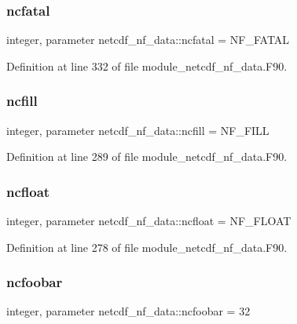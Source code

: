\subsubsection{\texorpdfstring{ncfatal}{ncfatal}}
{\footnotesize\ttfamily integer, parameter netcdf\+\_\+nf\+\_\+data\+::ncfatal = N\+F\+\_\+\+F\+A\+T\+AL}



Definition at line 332 of file module\+\_\+netcdf\+\_\+nf\+\_\+data.\+F90.

\mbox{\label{namespacenetcdf__nf__data_aed7a397c61803778ca06e67dc5c039de}} 
\subsubsection{\texorpdfstring{ncfill}{ncfill}}
{\footnotesize\ttfamily integer, parameter netcdf\+\_\+nf\+\_\+data\+::ncfill = N\+F\+\_\+\+F\+I\+LL}



Definition at line 289 of file module\+\_\+netcdf\+\_\+nf\+\_\+data.\+F90.

\mbox{\label{namespacenetcdf__nf__data_a9386c299382dba5511b511942e5093dc}} 
\subsubsection{\texorpdfstring{ncfloat}{ncfloat}}
{\footnotesize\ttfamily integer, parameter netcdf\+\_\+nf\+\_\+data\+::ncfloat = N\+F\+\_\+\+F\+L\+O\+AT}



Definition at line 278 of file module\+\_\+netcdf\+\_\+nf\+\_\+data.\+F90.

\mbox{\label{namespacenetcdf__nf__data_aad2cb51e82e60bfb7499e5f251482faa}} 
\subsubsection{\texorpdfstring{ncfoobar}{ncfoobar}}
{\footnotesize\ttfamily integer, parameter netcdf\+\_\+nf\+\_\+data\+::ncfoobar = 32}



